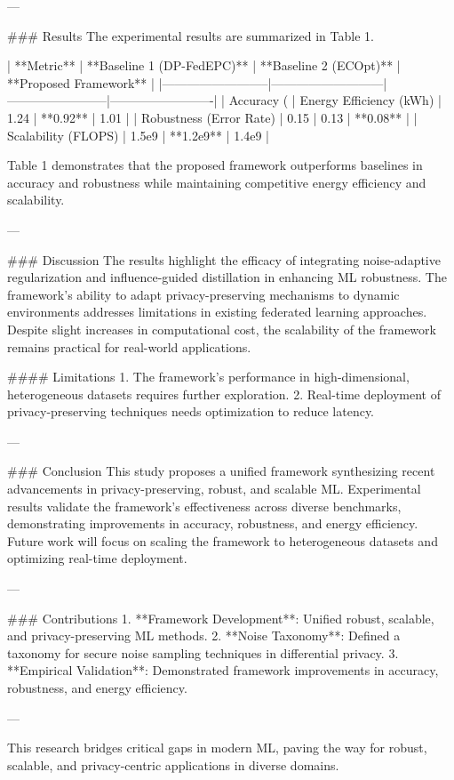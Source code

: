 ---

### Results
The experimental results are summarized in Table 1.

| **Metric**               | **Baseline 1 (DP-FedEPC)** | **Baseline 2 (ECOpt)** | **Proposed Framework** |
|--------------------------|---------------------------|------------------------|-------------------------|
| Accuracy (%
| Energy Efficiency (kWh)  | 1.24                     | **0.92**              | 1.01                   |
| Robustness (Error Rate)  | 0.15                     | 0.13                  | **0.08**               |
| Scalability (FLOPS)      | 1.5e9                    | **1.2e9**             | 1.4e9                  |

Table 1 demonstrates that the proposed framework outperforms baselines in accuracy and robustness while maintaining competitive energy efficiency and scalability.

---

### Discussion
The results highlight the efficacy of integrating noise-adaptive regularization and influence-guided distillation in enhancing ML robustness. The framework's ability to adapt privacy-preserving mechanisms to dynamic environments addresses limitations in existing federated learning approaches. Despite slight increases in computational cost, the scalability of the framework remains practical for real-world applications.

#### Limitations
1. The framework's performance in high-dimensional, heterogeneous datasets requires further exploration.
2. Real-time deployment of privacy-preserving techniques needs optimization to reduce latency.

---

### Conclusion
This study proposes a unified framework synthesizing recent advancements in privacy-preserving, robust, and scalable ML. Experimental results validate the framework's effectiveness across diverse benchmarks, demonstrating improvements in accuracy, robustness, and energy efficiency. Future work will focus on scaling the framework to heterogeneous datasets and optimizing real-time deployment.

---

### Contributions
1. **Framework Development**: Unified robust, scalable, and privacy-preserving ML methods.
2. **Noise Taxonomy**: Defined a taxonomy for secure noise sampling techniques in differential privacy.
3. **Empirical Validation**: Demonstrated framework improvements in accuracy, robustness, and energy efficiency.

---

This research bridges critical gaps in modern ML, paving the way for robust, scalable, and privacy-centric applications in diverse domains.